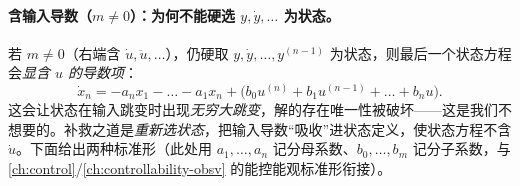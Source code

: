 \paragraph{含输入导数（$m\neq0$）：为何不能硬选 $y,\dot y,\dots$ 为状态。}
若 $m\neq0$（右端含 $\dot u,\ddot u,\dots$），仍硬取 $y,\dot y,\dots,y^{(n-1)}$ 为状态，则最后一个状态方程会\emph{显含 $u$ 的导数项}\cite{zhang2017modern}：
\begin{equation}
  \dot x_n=-a_n x_1-\dots-a_1 x_n+\big(b_0 u^{(n)}+b_1 u^{(n-1)}+\dots+b_n u\big).
  \label{eq:ssb-bad-state}
\end{equation}
这会让状态在输入跳变时出现\emph{无穷大跳变}，解的存在唯一性被破坏——这是我们不想要的。补救之道是\emph{重新选状态}，把输入导数“吸收”进状态定义，使状态方程不含 $\dot u$。下面给出两种标准形（此处用 $a_1,\dots,a_n$ 记分母系数、$b_0,\dots,b_m$ 记分子系数，与 \cref{ch:control}/\cref{ch:controllability-obsv} 的能控能观标准形衔接）。

